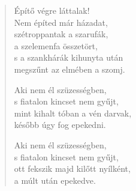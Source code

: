 \begin{verse}
 Építő végre láttalak!\\
Nem építed már házadat,\\
szétroppantak a szarufák,\\
a szelemenfa összetört,\\
s a szankhárák kihunyta után\\
megszűnt az elmében a szomj.

 Aki nem él szüzességben,\\
s fiatalon kincset nem gyűjt,\\
mint kihalt tóban a vén darvak,\\
később úgy fog epekedni.

 Aki nem él szüzességben,\\
s fiatalon kincset nem gyűjt,\\
ott fekszik majd kilőtt nyílként,\\
a múlt után epekedve.

\end{verse}
